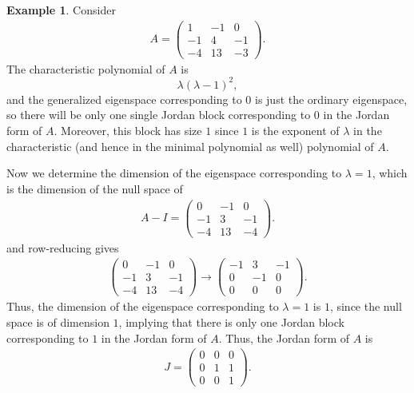\documentclass[10pt]{book}
\theoremstyle{definition}
\newtheorem{example}{Example}[chapter]
\numberwithin{equation}{chapter}
\begin{document}
\medskip

\begin{example}
Consider 
\begin{align*}
    A = \begin{pmatrix}
    1 & -1 & 0 \\
    -1 & 4 &  -1 \\
    -4 & 13 & -3 
    \end{pmatrix}.
\end{align*}
The characteristic polynomial of $A$ is 
$$\lambda(\lambda-1)^2,$$
and the generalized eigenspace corresponding to $0$ is just the ordinary eigenspace, so there will be only one single Jordan block corresponding to $0$ in the Jordan form of $A$. Moreover, this block has size $1$ since $1$ is the exponent of $\lambda$ in the characteristic (and hence in the minimal polynomial as well) polynomial of $A$.

Now we determine the dimension of the eigenspace corresponding to $\lambda = 1$, which is the dimension of the null space of
\begin{align*}
    A - I = \begin{pmatrix}
    0 & -1 & 0 \\
    -1 & 3 &  -1 \\
    -4 & 13 & -4 
    \end{pmatrix}.
\end{align*}
and row-reducing gives
\begin{align*}
    \begin{pmatrix}
    0 & -1 & 0 \\
    -1 & 3 &  -1 \\
    -4 & 13 & -4 
    \end{pmatrix} \to \begin{pmatrix}
    -1 & 3 &  -1 \\
    0 & -1 & 0 \\
    0 & 0 & 0 
    \end{pmatrix}.
\end{align*}
Thus, the dimension of the eigenspace corresponding to $\lambda = 1$ is $1$, since the null space is of dimension $1$, implying that there is only one Jordan block corresponding to $1$ in the Jordan form of $A$. Thus, the Jordan form of $A$ is
\begin{align*}
    J = \begin{pmatrix}
    0 & 0 &  0 \\
    0 & 1 & 1 \\
    0 & 0 & 1
    \end{pmatrix}.
\end{align*}
\end{example}
\end{document}
